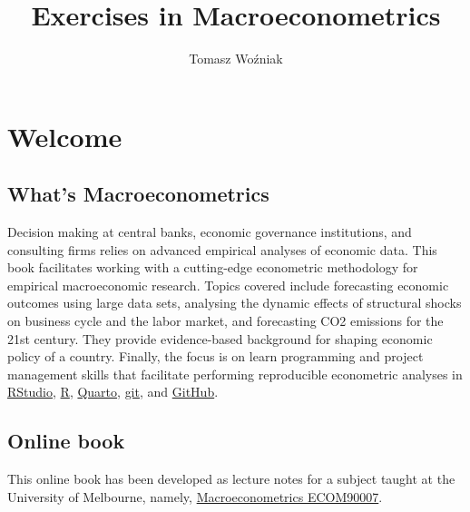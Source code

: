 \documentclass[
  letterpaper,
  DIV=11,
  numbers=noendperiod]{scrreprt}
\title{Exercises in Macroeconometrics}
\author{Tomasz Woźniak}
\date{}
\renewcommand*\contentsname{Table of contents}
\newcommand\contentsname{Table of contents}
\begin{document}
\maketitle
\ifdefined\Shaded\renewenvironment{Shaded}{\begin{tcolorbox}[borderline west={3pt}{0pt}{shadecolor}, enhanced, sharp corners, frame hidden, boxrule=0pt, interior hidden, breakable]}{\end{tcolorbox}}\fi

\renewcommand*\contentsname{Table of contents}
{
\hypersetup{linkcolor=}
\setcounter{tocdepth}{2}
\tableofcontents
}

\hypertarget{welcome}{%
\chapter*{Welcome}\label{welcome}}

\hypertarget{whats-macroeconometrics}{%
\section*{What's Macroeconometrics}\label{whats-macroeconometrics}}

Decision making at central banks, economic governance institutions, and
consulting firms relies on advanced empirical analyses of economic data.
This book facilitates working with a cutting-edge econometric
methodology for empirical macroeconomic research. Topics covered include
forecasting economic outcomes using large data sets, analysing the
dynamic effects of structural shocks on business cycle and the labor
market, and forecasting CO2 emissions for the 21st century. They provide
evidence-based background for shaping economic policy of a country.
Finally, the focus is on learn programming and project management skills
that facilitate performing reproducible econometric analyses in
\href{https://www.rstudio.com/}{RStudio},
\href{https://cran.r-project.org/}{R},
\href{https://quarto.org/}{Quarto}, \href{https://git-scm.com/}{git},
and \href{https://GitHub.com/}{GitHub}.

\hypertarget{online-book}{%
\section*{Online book}\label{online-book}}

This online book has been developed as lecture notes for a subject
taught at the University of Melbourne, namely,
\href{https://handbook.unimelb.edu.au/2022/subjects/ecom90007}{Macroeconometrics
ECOM90007}.
\end{document}
